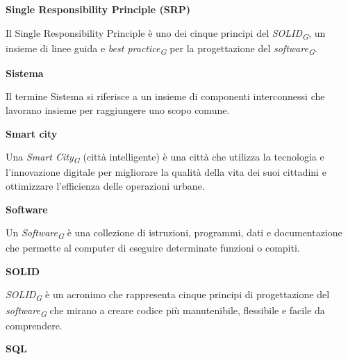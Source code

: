 \documentclass{article}
\begin{document}
\textbf{Single Responsibility Principle (SRP)}

\vspace{0.1cm}

Il Single Responsibility Principle è uno dei cinque principi del \textit{SOLID}\textsubscript{\textit{G}}, un insieme di linee guida e \textit{best practice}\textsubscript{\textit{G}} per la progettazione del \textit{software}\textsubscript{\textit{G}}.

\vspace{0.4cm}

\textbf{Sistema}

\vspace{0.1cm}

Il termine Sistema si riferisce a un insieme di componenti interconnessi che lavorano insieme per raggiungere uno scopo comune.

\vspace{0.4cm}

\textbf{Smart city}

\vspace{0.1cm}

Una \textit{Smart City}\textsubscript{\textit{G}} (città intelligente) è una città che utilizza la tecnologia e l'innovazione digitale per migliorare la qualità della vita dei suoi cittadini e ottimizzare l'efficienza delle operazioni urbane.

\vspace{0.4cm}

\textbf{Software}

\vspace{0.1cm}

Un \textit{Software}\textsubscript{\textit{G}} è una collezione di istruzioni, programmi, dati e documentazione che permette al computer di eseguire determinate funzioni o compiti.

\pagebreak

\textbf{SOLID}

\vspace{0.1cm}

\textit{SOLID}\textsubscript{\textit{G}} è un acronimo che rappresenta cinque principi di progettazione del \textit{software}\textsubscript{\textit{G}} che mirano a creare codice più manutenibile, flessibile e facile da comprendere.

\vspace{0.4cm}

\textbf{SQL}

\vspace{0.1cm}
\end{document}

